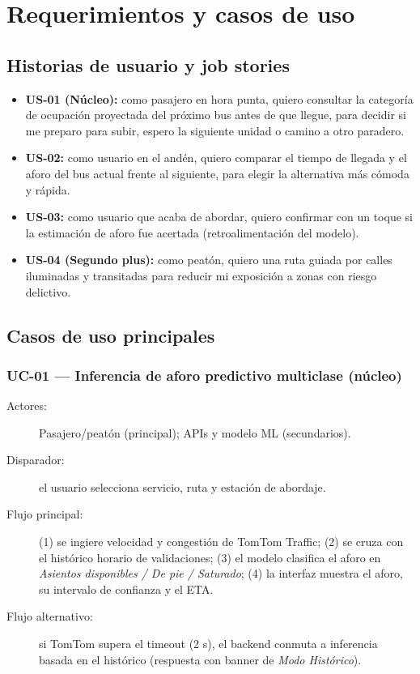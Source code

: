 \documentclass[11pt]{article}
\begin{document}
\section{Requerimientos y casos de uso}
\label{sec:req}
\subsection{Historias de usuario y job stories}
\begin{itemize}
  \item \textbf{US-01 (Núcleo):} como pasajero en hora punta, quiero consultar la categoría de
        ocupación proyectada del próximo bus antes de que llegue, para decidir si me preparo para subir,
        espero la siguiente unidad o camino a otro paradero.
  \item \textbf{US-02:} como usuario en el andén, quiero comparar el tiempo de llegada y el aforo del
        bus actual frente al siguiente, para elegir la alternativa más cómoda y rápida.
  \item \textbf{US-03:} como usuario que acaba de abordar, quiero confirmar con un toque si la
        estimación de aforo fue acertada (retroalimentación del modelo).
  \item \textbf{US-04 (Segundo plus):} como peatón, quiero una ruta guiada por calles iluminadas y
        transitadas para reducir mi exposición a zonas con riesgo delictivo.
\end{itemize}

\subsection{Casos de uso principales}
\subsubsection{UC-01 --- Inferencia de aforo predictivo multiclase (núcleo)}
\begin{description}
  \item[Actores:] Pasajero/peatón (principal); APIs y modelo ML (secundarios).
  \item[Disparador:] el usuario selecciona servicio, ruta y estación de abordaje.
  \item[Flujo principal:] (1) se ingiere velocidad y congestión de TomTom Traffic; (2) se cruza con el
        histórico horario de validaciones; (3) el modelo clasifica el aforo en \emph{Asientos
        disponibles / De pie / Saturado}; (4) la interfaz muestra el aforo, su intervalo de confianza y
        el ETA.
  \item[Flujo alternativo:] si TomTom supera el timeout (2 s), el backend conmuta a inferencia basada
        en el histórico (respuesta con banner de \emph{Modo Histórico}).
\end{description}
\end{document}
